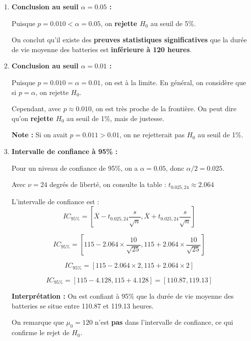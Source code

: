 \documentclass[11pt,a4paper]{article}
\begin{document}
\begin{enumerate}
    La p-value de $0.010$ signifie que :
    \begin{itemize}
        \item Si $H_0$ était vraie (si la durée de vie moyenne était vraiment $\geq 120$ heures)
        \item La probabilité d'observer une moyenne d'échantillon aussi faible (ou plus faible) que 115 heures
        \item Est d'environ 1\%
    \end{itemize}
    
    C'est une probabilité \textbf{faible}, ce qui suggère que les données observées sont peu compatibles avec $H_0$.
    
    \item \textbf{Conclusion au seuil $\alpha = 0.05$ :}
    
    Puisque $p = 0.010 < \alpha = 0.05$, on \textbf{rejette $H_0$} au seuil de 5\%.
    
    On conclut qu'il existe des \textbf{preuves statistiques significatives} que la durée de vie moyenne des batteries est \textbf{inférieure à 120 heures}.
    
    \item \textbf{Conclusion au seuil $\alpha = 0.01$ :}
    
    Puisque $p = 0.010 = \alpha = 0.01$, on est à la limite. En général, on considère que si $p = \alpha$, on rejette $H_0$.
    
    Cependant, avec $p \approx 0.010$, on est très proche de la frontière. On peut dire qu'on \textbf{rejette $H_0$} au seuil de 1\%, mais de justesse.
    
    \textbf{Note :} Si on avait $p = 0.011 > 0.01$, on ne rejetterait pas $H_0$ au seuil de 1\%.
    
    \item \textbf{Intervalle de confiance à 95\% :}
    
    Pour un niveau de confiance de 95\%, on a $\alpha = 0.05$, donc $\alpha/2 = 0.025$.
    
    Avec $\nu = 24$ degrés de liberté, on consulte la table : $t_{0.025, 24} \approx 2.064$
    
    L'intervalle de confiance est :
    $$IC_{95\%} = \left[\overline{X} - t_{0.025, 24} \frac{s}{\sqrt{n}}, \overline{X} + t_{0.025, 24} \frac{s}{\sqrt{n}}\right]$$
    
    $$IC_{95\%} = \left[115 - 2.064 \times \frac{10}{\sqrt{25}}, 115 + 2.064 \times \frac{10}{\sqrt{25}}\right]$$
    
    $$IC_{95\%} = \left[115 - 2.064 \times 2, 115 + 2.064 \times 2\right]$$
    
    $$IC_{95\%} = \left[115 - 4.128, 115 + 4.128\right] = [110.87, 119.13]$$
    
    \textbf{Interprétation :} On est confiant à 95\% que la durée de vie moyenne des batteries se situe entre 110.87 et 119.13 heures.
    
    On remarque que $\mu_0 = 120$ n'est \textbf{pas} dans l'intervalle de confiance, ce qui confirme le rejet de $H_0$.
\end{enumerate}
\end{document}

